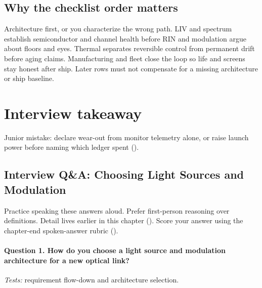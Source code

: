 \subsection{Why the checklist order matters}

Architecture first, or you characterize the wrong path. LIV and spectrum
establish semiconductor and channel health before RIN and modulation argue
about floors and eyes. Thermal separates reversible control from permanent
drift before aging claims. Manufacturing and fleet close the loop so life and
screens stay honest after ship. Later rows must not compensate for a missing
architecture or ship baseline.

\section{Interview takeaway}
\label{sec:lasers-design-review}


Junior mistake: declare wear-out from monitor telemetry alone, or raise launch
power before naming which ledger spent ().

\subsection{Interview Q\&A: Choosing Light Sources and Modulation}
\label{sec:lasers-interview-qa}

Practice speaking these answers aloud. Prefer first-person reasoning over
definitions. Detail lives earlier in this chapter
().
Score your answer using the chapter-end spoken-answer rubric
().

\paragraph{Question 1. How do you choose a light source and modulation
architecture for a new optical link?}
\textit{Tests:} requirement flow-down and architecture selection.

